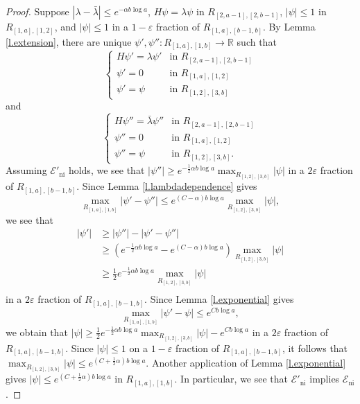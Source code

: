 \documentclass{amsart}
\newcommand{\lref}[1]{Lemma \ref{l.#1}}
\numberwithin{equation}{section}
\numberwithin{figure}{section}
\newcommand{\R}{\mathbb{R}}
\newcommand{\ep}{\varepsilon}
\begin{document}
\begin{proof}
Suppose $|\lambda - \bar \lambda| \leq e^{-\alpha b \log a}$, $H \psi = \lambda \psi$ in $R_{[2,a-1],[2,b-1]}$, $|\psi| \leq 1$ in $R_{[1,a],[1,2]}$, and $|\psi| \leq 1$ in a $1-\ep$ fraction of $R_{[1,a],[b-1,b]}$.  By \lref{extension}, there are unique $\psi', \psi'' : R_{[1,a],[1,b]} \to \R$ such that
\begin{equation*}
\begin{cases}
H \psi' = \lambda \psi' & \mbox{in } R_{[2,a-1],[2,b-1]} \\
\psi' = 0 & \mbox{in } R_{[1,a],[1,2]} \\
\psi' = \psi & \mbox{in } R_{[1,2],[3,b]}
\end{cases}
\end{equation*}
and
\begin{equation*}
\begin{cases}
H \psi'' = \bar \lambda \psi'' & \mbox{in } R_{[2,a-1],[2,b-1]} \\
\psi'' = 0 & \mbox{in } R_{[1,a],[1,2]} \\
\psi'' = \psi & \mbox{in } R_{[1,2],[3,b]}.
\end{cases}
\end{equation*}
Assuming $\mathcal E'_{\mathrm{ni}}$ holds, we see that $|\psi''| \geq e^{- \frac12 \alpha b \log a} \max_{R_{[1,2],[3,b]}} |\psi|$ in a $2\ep$ fraction of $R_{[1,a],[b-1,b]}$.  Since \lref{lambdadependence} gives
\begin{equation*}
\max_{R_{[1,a],[1,b]}} |\psi' - \psi''| \leq e^{(C - \alpha) b \log a} \max_{R_{[1,2],[3,b]}} |\psi|,
\end{equation*}
we see that
\begin{equation*}
\begin{aligned}
|\psi'| & \geq |\psi''| - |\psi' - \psi''| \\
& \geq (e^{-\frac12 \alpha b \log a} - e^{(C - \alpha) b \log a}) \max_{R_{[1,2],[3,b]}} |\psi| \\
& \geq \tfrac12 e^{-\tfrac12 \alpha b \log a} \max_{R_{[1,2],[3,b]}} |\psi| \\
\end{aligned}
\end{equation*}
in a $2\ep$ fraction of $R_{[1,a],[b-1,b]}$.  Since \lref{exponential} gives\begin{equation*}
\max_{R_{[1,a],[1,b]}} |\psi' - \psi| \leq e^{C b \log a},
\end{equation*}
we obtain that $|\psi| \geq \tfrac12 e^{- \frac12 \alpha b \log a} \max_{R_{[1,2],[3,b]}} |\psi| - e^{C b \log a}$ in a $2 \ep$ fraction of $R_{[1,a],[b-1,b]}$.  Since $|\psi| \leq 1$ on a $1-\ep$ fraction of $R_{[1,a],[b-1,b]}$, it follows that $\max_{R_{[1,2],[3,b]}} |\psi| \leq e^{(C + \frac12 \alpha)b \log a}$.  Another application of \lref{exponential} gives $|\psi| \leq e^{(C + \frac12 \alpha) b \log a}$ in $R_{[1,a],[1,b]}$.  In particular, we see that $\mathcal E'_{\mathrm{ni}}$ implies $\mathcal E_{\mathrm{ni}}$.


\end{proof}
\end{document}
